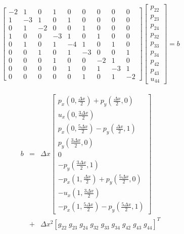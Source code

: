 \documentclass[journal]{IEEEtran}
\begin{document}
\begin{eqnarray}
\left[\begin{array}{ccccccccc}
-2 & 1 & 0 & 1 & 0 & 0 & 0 & 0 & 0\\
1 & -3 & 1 & 0 & 1 & 0 & 0 & 0 & 0\\
0 & 1 & -2 & 0 & 0 & 1 & 0 & 0 & 0\\
1 & 0 & 0 & -3 & 1 & 0 & 1 & 0 & 0\\
0 & 1 & 0 & 1 & -4 & 1 & 0 & 1 & 0\\
0 & 0 & 1 & 0 & 1 & -3 & 0 & 0 & 1\\
0 & 0 & 0 & 1 & 0 & 0 & -2 & 1 & 0\\
0 & 0 & 0 & 0 & 1 & 0 & 1 & -3 & 1\\
0 & 0 & 0 & 0 & 0 & 1 & 0 & 1 & -2 
\end{array}\right] \left[\begin{array}{c}
p_{22}\\ p_{23}\\ p_{24}	\\ p_{32}\\ p_{33}\\ p_{34}\\ p_{42}\\p_{43} \\u_{44}
\end{array}\right] = b \label{matrixAnulleigen}
\end{eqnarray}

\begin{eqnarray}
b & = & \Delta x\left[\begin{array}{c}
p_x\left(0, \frac{\Delta x}{2}\right) + p_y\left(\frac{\Delta x}{2},0\right)\\
u_x\left(0, \frac{3\Delta x}{2}\right)\\
p_x\left(0, \frac{5\Delta x}{2}\right) - p_y\left(\frac{\Delta x}{2},1\right)\\
p_y\left(\frac{3\Delta x}{2},0\right)\\
0 \\
-p_y\left(\frac{3\Delta x}{2},1\right)\\
-p_x\left(1, \frac{\Delta x}{2}\right) + p_y\left(\frac{5\Delta x}{2},0\right)\\
-u_x\left(1, \frac{3\Delta x}{2}\right)\\
-p_x\left(1, \frac{5\Delta x}{2}\right) - p_y\left(\frac{5\Delta x}{2}, 1\right)
\end{array}\right] \nonumber\\
&+& \Delta x^2 \left[
g_{22}\; g_{23}\; g_{24}\; g_{32}\; g_{33}\; g_{34}\; g_{42}\; g_{43} \; g_{44}
\right]^T \label{bPartnulleigen}
\end{eqnarray}
\end{document}
